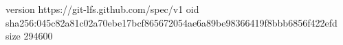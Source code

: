 version https://git-lfs.github.com/spec/v1
oid sha256:045c82a81c02a70ebe17bcf865672054ae6a89be98366419f8bbb6856f422efd
size 294600

